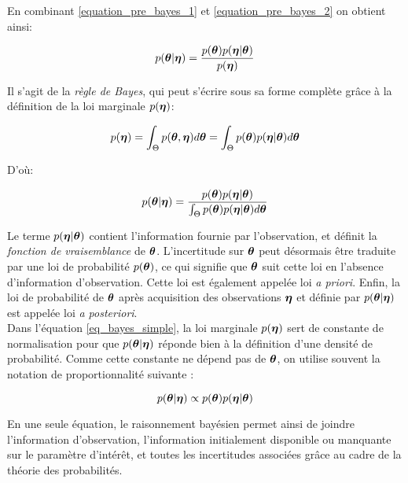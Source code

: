 	En combinant \eqref{equation_pre_bayes_1} et \eqref{equation_pre_bayes_2} on obtient ainsi:
	
	\begin{equation}
		p({\bm{\theta}} | {\bm{\eta}}) = \dfrac{p({\bm{\theta}})p({\bm{\eta}} | {\bm{\theta}})}{p({\bm{\eta}})}
		\label{eq_bayes_simple}
	\end{equation}
	
	Il s'agit de la \textit{règle de Bayes}, qui peut s'écrire sous sa forme complète grâce à la définition de la loi marginale $p({\bm{\eta}})$:
	
	\begin{equation}
		p({\bm{\eta}}) = \int_{\Theta} p({\bm{\theta}},{\bm{\eta}})d{\bm{\theta}} = \int_{\Theta} p({\bm{\theta}})p({\bm{\eta}}|{\bm{\theta}})d{\bm{\theta}}
		\label{eq_definition_marginale_d}
	\end{equation}
	
	D'où:

	\begin{equation}
	p({\bm{\theta}} | {\bm{\eta}}) = \dfrac{p({\bm{\theta}})p({\bm{\eta}} | {\bm{\theta}})}{ \int_{\Theta} p({\bm{\theta}})p({\bm{\eta}}|{\bm{\theta}})d{\bm{\theta}}}
	\label{eq_bayes_simple}
	\end{equation}
	
	Le terme $p({\bm{\eta}}|{\bm{\theta}})$ contient l'information fournie par l'observation, {et définit la \textit{fonction de vraisemblance} de ${\bm{\theta}}$.} 
	L'incertitude sur ${\bm{\theta}}$ peut désormais être traduite par une loi de probabilité $p({\bm{\theta}})$, ce qui signifie que ${\bm{\theta}}$ suit cette loi en l'absence d'information d'observation. Cette loi est également appelée loi  \textit{a priori}. 
	Enfin, la loi de probabilité de ${\bm{\theta}}$ après acquisition des observations ${\bm{\eta}}$ et définie par  	$p({\bm{\theta}} | {\bm{\eta}})$ est appelée loi \textit{a posteriori}.\\
	
	Dans l'équation \eqref{eq_bayes_simple}, la loi marginale $p({\bm{\eta}})$ sert de constante de normalisation pour que $p({\bm{\theta}} | {\bm{\eta}})$ réponde bien à la définition d'une densité de probabilité. Comme cette constante ne dépend pas de ${\bm{\theta}}$, on utilise souvent la notation de proportionnalité suivante : 
	
	\begin{equation}
	p({\bm{\theta}} | {\bm{\eta}}) \propto p({\bm{\theta}})p({\bm{\eta}} | {\bm{\theta}})
	\label{eq_bayes_proportionnalite}
	\end{equation}
	
	En une seule équation, le raisonnement bayésien permet ainsi de joindre l'information d'observation, l'information initialement disponible ou manquante sur le paramètre d'intérêt, et toutes les incertitudes associées grâce au cadre de la théorie des probabilités.
	
